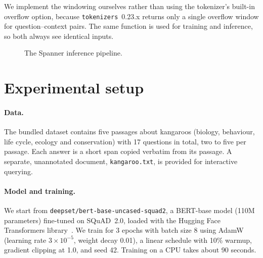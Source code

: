 \documentclass[11pt,a4paper]{article}
\begin{document}
We implement the windowing ourselves rather than using the tokenizer's built-in overflow option, because \texttt{tokenizers}~0.23.x returns only a single overflow window for question--context pairs. The same function is used for training and inference, so both always see identical inputs.

\begin{figure}[t]
\centering
{}
\caption{The Spanner inference pipeline.}
\label{fig:pipeline}
\end{figure}

\section{Experimental setup}

\paragraph{Data.} The bundled dataset contains five passages about kangaroos (biology, behaviour, life cycle, ecology and conservation) with 17 questions in total, two to five per passage. Each answer is a short span copied verbatim from its passage. A separate, unannotated document, \texttt{kangaroo.txt}, is provided for interactive querying.

\paragraph{Model and training.} We start from \texttt{deepset/bert-base-uncased-squad2}, a BERT-base model (110M parameters) fine-tuned on SQuAD~2.0, loaded with the Hugging Face Transformers library~\cite{wolf2020transformers}. We train for 3 epochs with batch size 8 using AdamW~\cite{loshchilov2019adamw} (learning rate $3\times10^{-5}$, weight decay 0.01), a linear schedule with 10\% warmup, gradient clipping at 1.0, and seed 42. Training on a CPU takes about 90 seconds.
\end{document}
